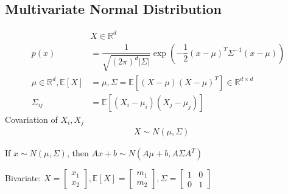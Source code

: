 \documentclass{article}
\begin{document}
\subsection{Multivariate Normal Distribution}
\begin{align*}
&X  \in \mathbb{R}^{d}
\\ p\left(x\right)  &= \dfrac{1}{\sqrt{\left(2 \pi\right)^{d} | \Sigma |}} \exp\left(- \dfrac{1}{2} \left(x - \mu\right)^{T} \Sigma^{-1} \left(x - \mu\right)\right)
\\ \mu \in \mathbb{R}^{d}, \mathbb{E}\left[X\right] &= \mu, \Sigma = \mathbb{E}\left[\left(X - \mu\right)\left(X - \mu\right)^{T}\right] \in \mathbb{R}^{d \times d}
\\ \Sigma_{ij} &= \mathbb{E}\left[\left(X_{i} - \mu_{i}\right)\left(X_{j} - \mu_{j}\right)\right]
\end{align*}
Covariation of $X_{i}, X_{j}$
\begin{align*}
&X  \sim  N\left(\mu, \Sigma\right)
\end{align*}

If $x  \sim  N\left(\mu, \Sigma\right)$, then $A  x + b \sim  N\left(A \mu + b, A \Sigma A^{T}\right)$

Bivariate: $X  = \begin{bmatrix} x_{1} \\ x_{2} \end{bmatrix} , \mathbb{E}\left[X\right] = \begin{bmatrix} m_{1} \\ m_{2} \end{bmatrix} , \Sigma = \begin{bmatrix} 1 & 0 \\ 0 & 1 \end{bmatrix}$
\end{document}
